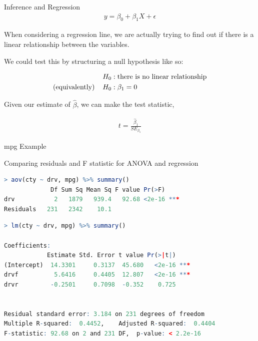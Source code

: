 \documentclass{beamer}
\begin{document}
\begin{frame}{Inference and Regression}
\begin{align*}
y = \beta_0 + \beta_1X + \epsilon
\end{align*}

When considering a regression line, we are actually trying to find out if there is a linear relationship between the variables. \vspace{6mm}

We could test this by structuring a null hypothesis like so: \vspace{-4mm}

\begin{align*}
H_0: \hspace{1mm} &\text{there is no linear relationship} \\
(\text{equivalently}) \hspace{4mm} H_0: \hspace{1mm} &\beta_1 = 0\\
\end{align*}

Given our estimate of $\hat{\beta}$, we can make the test statistic, 

\begin{align*}
t = \frac{\hat{\beta}_1}{SE_{\beta_1}}
\end{align*}
\end{frame}



\begin{frame}[fragile]{mpg Example}

Comparing residuals and F statistic for ANOVA and regression

\begin{lstlisting}[language=R]
> aov(cty ~ drv, mpg) %>% summary()
             Df Sum Sq Mean Sq F value Pr(>F)    
drv           2   1879   939.4   92.68 <2e-16 ***
Residuals   231   2342    10.1                   

\end{lstlisting}
\begin{lstlisting}[language=R]
> lm(cty ~ drv, mpg) %>% summary() 

Coefficients:
            Estimate Std. Error t value Pr(>|t|)    
(Intercept)  14.3301     0.3137  45.680   <2e-16 ***
drvf          5.6416     0.4405  12.807   <2e-16 ***
drvr         -0.2501     0.7098  -0.352    0.725    


Residual standard error: 3.184 on 231 degrees of freedom
Multiple R-squared:  0.4452,	Adjusted R-squared:  0.4404 
F-statistic: 92.68 on 2 and 231 DF,  p-value: < 2.2e-16
\end{lstlisting}

\end{frame}
\end{document}
